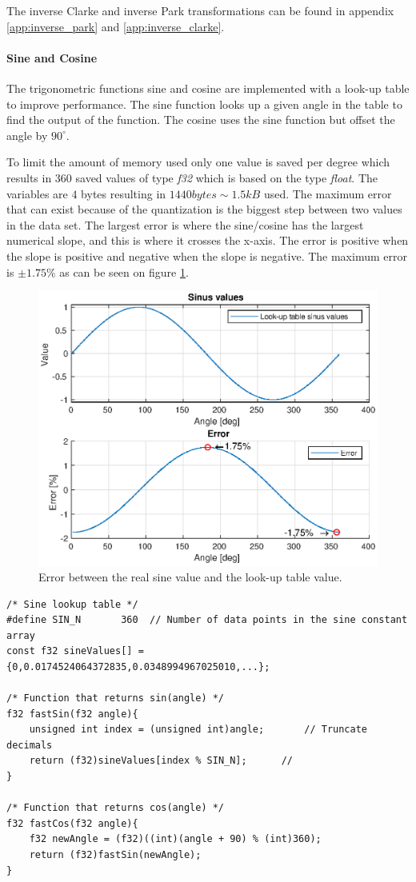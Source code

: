 The inverse Clarke and inverse Park transformations can be found in appendix \ref{app:inverse_park} and \ref{app:inverse_clarke}.


\paragraph{Sine and Cosine}
\label{sec:sine_cosine}
The trigonometric functions sine and cosine are implemented with a look-up table to improve performance. The sine function looks up a given angle in the table to find the output of the function. The cosine uses the sine function but offset the angle by $90 ^{\circ}$. 

To limit the amount of memory used only one value is saved per degree which results in $360$ saved values of type \textit{f32} which is based on the type \textit{float}. The variables are $4$ bytes resulting in $1440 bytes \sim 1.5kB$ used.
The maximum error that can exist because of the quantization is the biggest step between two values in the data set. 
The largest error is where the sine/cosine has the largest numerical slope, and this is where it crosses the x-axis. The error is positive when the slope is positive and negative when the slope is negative. The maximum error is $\pm 1.75 \%$ as can be seen on figure \ref{fig:sinus_lookup_error}. 
\begin{figure}[H]
	\centering
	\includegraphics[width=0.6 \textwidth]{pictures/software/sinus_lookup_error.eps}
	\caption{Error between the real sine value and the look-up table value.}
	\label{fig:sinus_lookup_error}
\end{figure}



\begin{lstlisting}[style=c, caption=Sine and cosine implemented with look-up tables., label=code:lookup_table]
/* Sine lookup table */
#define SIN_N 		360	 // Number of data points in the sine constant array
const f32 sineValues[] = {0,0.0174524064372835,0.0348994967025010,...};

/* Function that returns sin(angle) */
f32 fastSin(f32 angle){
	unsigned int index = (unsigned int)angle;       // Truncate decimals
	return (f32)sineValues[index % SIN_N];      // 
}	

/* Function that returns cos(angle) */
f32 fastCos(f32 angle){
	f32 newAngle = (f32)((int)(angle + 90) % (int)360);
	return (f32)fastSin(newAngle);
}
\end{lstlisting}